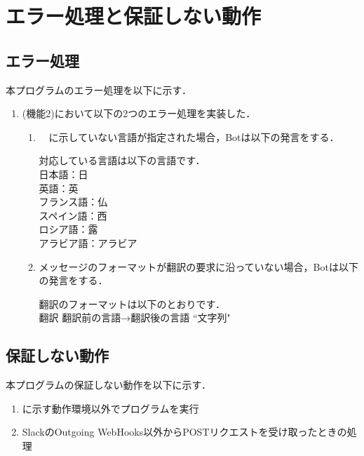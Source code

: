 \documentclass[fleqn, 14pt]{sty/extarticlej}
\begin{document}
\section{エラー処理と保証しない動作}
\subsection{エラー処理}
本プログラムのエラー処理を以下に示す．
\begin{enumerate}
\item (機能2)において以下の2つのエラー処理を実装した．
  \begin{enumerate}
  \item　に示していない言語が指定された場合，Botは以下の発言をする．

    対応している言語は以下の言語です．\\
    日本語：日\\
    英語：英\\
    フランス語：仏\\
    スペイン語：西\\
    ロシア語：露\\
    アラビア語：アラビア\\

  \item メッセージのフォーマットが翻訳の要求に沿っていない場合，Botは以下の発言をする．

    翻訳のフォーマットは以下のとおりです．\\
    翻訳 翻訳前の言語→翻訳後の言語 ``文字列"\\
  \end{enumerate}
\end{enumerate}




\subsection{保証しない動作}
本プログラムの保証しない動作を以下に示す．
\begin{enumerate}
\item {}に示す動作環境以外でプログラムを実行
\item SlackのOutgoing WebHooks以外からPOSTリクエストを受け取ったときの処理
\end{enumerate}



\end{document}
